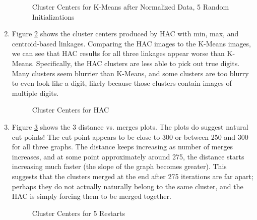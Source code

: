 \documentclass[submit]{harvardml}
\begin{document}
\begin{enumerate}
\begin{figure}[H]
    \caption{Cluster Centers for K-Means after Normalized Data, 5 Random Initializations}
    \label{fig:norm}
    \end{figure}
    
    \item Figure \ref{fig:HAC} shows the cluster centers produced by HAC with min, max, and centroid-based linkages. Comparing the HAC images to the K-Means images, we can see that HAC results for all three linkages appear worse than K-Means. Specifically, the HAC clusters are less able to pick out true digits. Many clusters seem blurrier than K-Means, and some clusters are too blurry to even look like a digit, likely because those clusters contain images of multiple digits.
    
    \begin{figure}[H]
    \centering
    
    \caption{Cluster Centers for HAC}
    \label{fig:HAC}
    \end{figure}
    
    \item Figure \ref{fig:HAC-dist} shows the 3 distance vs. merges plots. The plots do suggest natural cut points! The cut point appears to be close to 300 or between 250 and 300 for all three graphs. The distance keeps increasing as number of merges increases, and at some point approximately around 275, the distance starts increasing much faster (the slope of the graph becomes greater). This suggests that the clusters merged at the end after 275 iterations are far apart; perhaps they do not actually naturally belong to the same cluster, and the HAC is simply forcing them to be merged together.
    \begin{figure}[H]
    \centering
    \caption{Cluster Centers for 5 Restarts}
    \label{fig:HAC-dist}
    \end{figure}
    

\end{enumerate}
\end{document}

